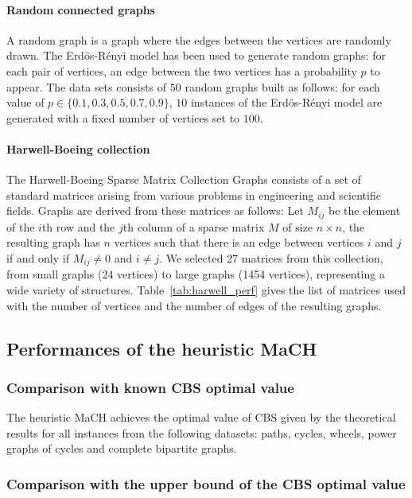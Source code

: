 \documentclass{scrartcl}
\theoremstyle{plain}
\newcommand{\algo}{MaCH}
\newcommand{\cbs}{CBS}
\begin{document}
\paragraph{\textbf{Random connected graphs}}
A random graph \cite{Durrett2007} is a graph where the edges between the 
vertices are randomly drawn. The Erd\"os-R\'enyi model has been used to generate 
random graphs: for each pair of vertices, an edge between the two vertices has a 
probability $p$ to appear. The data sets consists of $50$ random graphs built 
as follows: for each value of $p \in \{0.1, 0.3, 0.5, 0.7, 0.9\}$, $10$ 
instances of the Erd\"os-R\'enyi model are generated with a fixed number of 
vertices set to $100$.

\paragraph{\textbf{Harwell-Boeing collection}}
The Harwell-Boeing Sparse Matrix Collection Graphs \cite{Duff1992} consists of 
a set of standard matrices arising from various problems in engineering and 
scientific fields. Graphs are derived from these matrices as follows: Let 
$M_{ij}$ be the element of the $i$th row and the $j$th column of a sparse matrix 
$M$ of size $n \times n$, the resulting graph has $n$ vertices such that there 
is an edge between vertices $i$ and $j$ if and only if $M_{ij} \neq 0$ and 
$i\neq j$. We selected $27$ matrices from this collection, from small graphs (24 
vertices) to large graphs (1454 vertices), representing a wide variety of 
structures. Table~\ref{tab:harwell_perf} gives the list of matrices used with 
the 
number of vertices and the number of edges of the resulting graphs.

\subsection{Performances of the heuristic \algo{}}

\subsubsection{Comparison with known \cbs{} optimal value}

The heuristic \algo{} achieves the optimal value of \cbs{} given by the 
theoretical results for all instances from the following datasets: paths, 
cycles, wheels, power graphs of cycles and complete bipartite graphs.

\subsubsection{Comparison with the upper bound of the \cbs{} optimal value}
\end{document}

